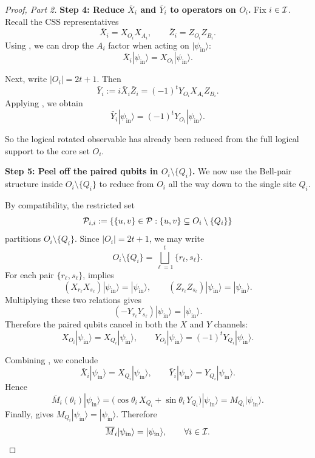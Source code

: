 \begin{proof}[Proof, Part 2]
\textbf{Step 4: Reduce $\bar X_i$ and $\bar Y_i$ to operators on $O_i$.}
Fix $i\in\mathcal{I}$.
Recall the CSS representatives
\begin{equation}
\bar X_i = X_{O_i}X_{A_i},
\qquad
\bar Z_i = Z_{O_i}Z_{B_i}.
\label{eq:css-reps-app}
\end{equation}
Using , we can drop the $A_i$ factor when acting on
$|\psi_{\mathrm{in}}\rangle$:
\begin{equation}
\bar X_i|\psi_{\mathrm{in}}\rangle = X_{O_i}|\psi_{\mathrm{in}}\rangle.
\label{eq:X-reduce-to-Oi-app}
\end{equation}

Next, write $|O_i|=2t+1$.
Then
\[
\bar Y_i := i\bar X_i\bar Z_i = (-1)^t Y_{O_i}X_{A_i}Z_{B_i}.
\]
Applying , we obtain
\begin{equation}
\bar Y_i|\psi_{\mathrm{in}}\rangle = (-1)^t Y_{O_i}|\psi_{\mathrm{in}}\rangle.
\label{eq:Y-reduce-to-Oi-app}
\end{equation}

So the logical rotated observable has already been reduced from the full
logical support to the core set $O_i$.

\medskip
\noindent
\textbf{Step 5: Peel off the paired qubits in $O_i\setminus\{Q_i\}$.}
We now use the Bell-pair structure inside $O_i\setminus\{Q_i\}$ to reduce from
$O_i$ all the way down to the single site $Q_i$.

By compatibility, the restricted set
\[
\mathcal{P}_{i,i}:=\{\{u,v\}\in\mathcal{P}:\{u,v\}\subseteq O_i\setminus\{Q_i\}\}
\]
partitions $O_i\setminus\{Q_i\}$.
Since $|O_i|=2t+1$, we may write
\[
O_i\setminus\{Q_i\}=\bigsqcup_{\ell=1}^t \{r_\ell,s_\ell\}.
\]
For each pair $\{r_\ell,s_\ell\}$,  implies
\[
(X_{r_\ell}X_{s_\ell})|\psi_{\mathrm{in}}\rangle=|\psi_{\mathrm{in}}\rangle,
\qquad
(Z_{r_\ell}Z_{s_\ell})|\psi_{\mathrm{in}}\rangle=|\psi_{\mathrm{in}}\rangle.
\]
Multiplying these two relations gives
\[
(-Y_{r_\ell}Y_{s_\ell})|\psi_{\mathrm{in}}\rangle=|\psi_{\mathrm{in}}\rangle.
\]
Therefore the paired qubits cancel in both the $X$ and $Y$ channels:
\begin{equation}
X_{O_i}|\psi_{\mathrm{in}}\rangle = X_{Q_i}|\psi_{\mathrm{in}}\rangle,
\qquad
Y_{O_i}|\psi_{\mathrm{in}}\rangle = (-1)^t Y_{Q_i}|\psi_{\mathrm{in}}\rangle.
\label{eq:O-to-Q-app}
\end{equation}

Combining ,
we conclude
\[
\bar X_i|\psi_{\mathrm{in}}\rangle = X_{Q_i}|\psi_{\mathrm{in}}\rangle,
\qquad
\bar Y_i|\psi_{\mathrm{in}}\rangle = Y_{Q_i}|\psi_{\mathrm{in}}\rangle.
\]
Hence
\[
\bar M_i(\theta_i)|\psi_{\mathrm{in}}\rangle
=
\bigl(\cos\theta_i\,X_{Q_i}+\sin\theta_i\,Y_{Q_i}\bigr)|\psi_{\mathrm{in}}\rangle
=
M_{Q_i}|\psi_{\mathrm{in}}\rangle.
\]
Finally,  gives
$M_{Q_i}|\psi_{\mathrm{in}}\rangle=|\psi_{\mathrm{in}}\rangle$.
Therefore
\[
\overline{M}_i|\psi_{\mathrm{in}}\rangle = |\psi_{\mathrm{in}}\rangle,
\qquad \forall i\in\mathcal{I}.
\]


\end{proof}
